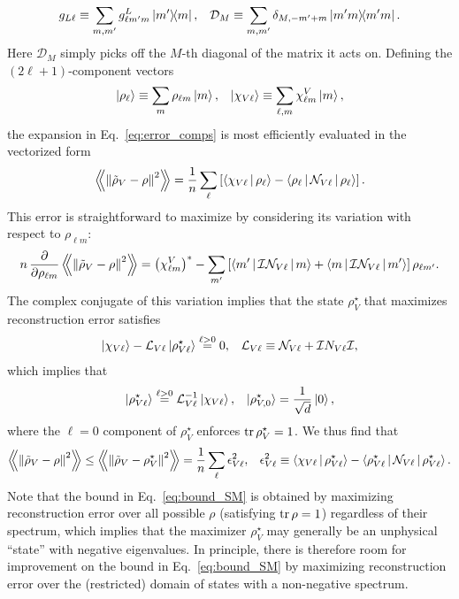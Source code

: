 \documentclass[notitlepage,twocolumn]{revtex4-2}
\newcommand{\f}[2]{\dfrac{#1}{#2}} %
\newcommand{\p}[1]{\left(#1\right)} %
\renewcommand{\sp}[1]{\left[#1\right]} %
\newcommand{\bk}{\Braket} %
\newcommand{\Bbk}[1]
{\left\langle\!\!\left\langle #1 \right\rangle\!\!\right\rangle}
\newcommand{\D}{\mathcal{D}}
\newcommand{\I}{\mathcal{I}}
\renewcommand{\L}{\mathcal{L}}
\newcommand{\N}{\mathcal{N}}
\newcommand{\1}{\mathds{1}}
\begin{document}
\begin{align}
  g_{L\ell} \equiv \sum_{m,m'} g^L_{\ell m'm} \op{m'}{m},
  &&
  \D_M \equiv \sum_{m,m'} \delta_{M,-m'+m} \op{m'm}.
\end{align}
Here $\D_M$ simply picks off the $M$-th diagonal of the matrix it acts on.
Defining the $\p{2\ell+1}$-component vectors
\begin{align}
  \ket{\rho_\ell} \equiv \sum_m \rho_{\ell m} \ket{m},
  &&
  \ket{\chi_{V\ell}} \equiv \sum_{\ell,m} \chi^V_{\ell m} \ket{m},
\end{align}
the expansion in Eq.~\eqref{eq:error_comps} is most efficiently evaluated in the vectorized form
\begin{align}
  \Bbk{\norm{\tilde\rho_V-\rho}^2}
  = \f1n \sum_\ell \sp{\bk{\chi_{V\ell}|\rho_\ell}
    - \bk{\rho_\ell|\N_{V\ell}|\rho_\ell}}.
\end{align}
This error is straightforward to maximize by considering its variation with respect to $\rho_{\ell m}$:
\begin{align}
  n\, \f{\partial}{\partial\rho_{\ell m}}
  \Bbk{\norm{\tilde\rho_V-\rho}^2}
  = \p{\chi^V_{\ell m}}^*
  - \sum_{m'} \sp{\bk{m'|\I\N_{V\ell}|m} + \bk{m|\I\N_{V\ell}|m'}}
  \rho_{\ell m'}.
\end{align}
The complex conjugate of this variation implies that the state $\rho_V^\star$ that maximizes reconstruction error satisfies
\begin{align}
  \ket{\chi_{V\ell}} - \L_{V\ell} \ket{\rho_{V\ell}^\star}
  \stackrel{\ell>0}{=} 0,
  &&
  \L_{V\ell} \equiv \N_{V\ell} + \I N_{V\ell} \I,
\end{align}
which implies that
\begin{align}
  \ket{\rho_{V\ell}^\star} \stackrel{\ell>0}{=}
  \L_{V\ell}^{-1} \ket{\chi_{V\ell}},
  &&
  \ket{\rho_{V,0}^\star} = \f1{\sqrt{d}} \ket{0},
\end{align}
where the $\ell=0$ component of $\rho_V^\star$ enforces $\tr\rho_V^\star=1$.
We thus find that
\begin{align}
  \Bbk{\norm{\tilde\rho_V-\rho}^2}
  \le \Bbk{\norm{\tilde\rho_V-\rho_V^\star}^2}
  = \f1n \sum_\ell \epsilon_{V\ell}^2,
  &&
  \epsilon_{V\ell}^2 \equiv \bk{\chi_{V\ell}|\rho_{V\ell}^\star}
  - \bk{\rho_{V\ell}^\star|\N_{V\ell}|\rho_{V\ell}^\star}.
  \label{eq:bound_SM}
\end{align}
Note that the bound in Eq.~\eqref{eq:bound_SM} is obtained by maximizing reconstruction error over all possible $\rho$ (satisfying $\tr\rho=1$) regardless of their spectrum, which implies that the maximizer $\rho_V^\star$ may generally be an unphysical ``state'' with negative eigenvalues.
In principle, there is therefore room for improvement on the bound in Eq.~\eqref{eq:bound_SM} by maximizing reconstruction error over the (restricted) domain of states with a non-negative spectrum.
\end{document}

